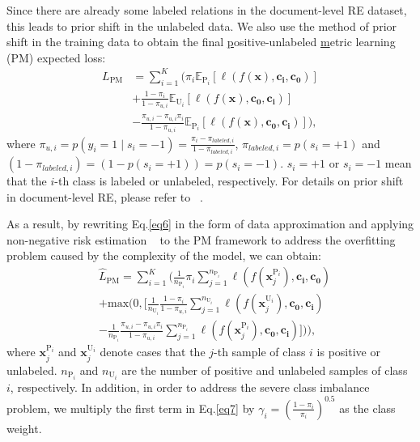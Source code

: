 \documentclass[letterpaper]{article}
\begin{document}
Since there are already some labeled relations in the document-level RE dataset, this leads to prior shift in the unlabeled data. We also use the method of prior shift in the training data to obtain the final \underline{p}ositive-unlabeled \underline{m}etric learning (PM) expected loss:
\begin{equation}
\begin{aligned}\label{eq6}
L_{\mathrm{PM}}&=\sum_{i=1}^{K}(\pi_{i} \mathbb{E}_{\mathrm{P}_{i}}[ \ell(f(\boldsymbol{x}), \boldsymbol{c_{i}}, \boldsymbol{c_{0}})] \\
&+\frac{1-\pi_{i}}{1-\pi_{u,i}} \mathbb{E}_{\mathrm{U}_{i}}[\ell(f(\boldsymbol{x}), \boldsymbol{c_{0}}, \boldsymbol{c_{i}})] \\
&-\frac{\pi_{u,i}-\pi_{u,i} \pi_{i}}{1-\pi_{u,i}}\mathbb{E}_{\mathrm{P}_{i}}[\ell(f(\boldsymbol{x}), \boldsymbol{c_{0}}, \boldsymbol{c_{i}})]),
\end{aligned}
\end{equation}
where $\pi_{u,i}=p(y_{i}=1 \mid s_{i}=-1)=\frac{\pi_{i}-\pi_{labeled,i}}{1-\pi_{labeled,i}}$, $\pi_{labeled,i}=p(s_{i}=+1)$ and $(1-\pi_{labeled,i})=(1-p(s_{i}=+1))=p(s_{i}=-1)$. $s_{i}=+1$ or $s_{i}=-1$ mean that the $i$-th class is labeled or unlabeled, respectively. For details on prior shift in document-level RE, please refer to ~\cite{DBLP:conf/emnlp/WangLHZ22}.

As a result, by rewriting Eq.\ref{eq6} in the form of data approximation and applying non-negative risk estimation ~\cite{DBLP:conf/nips/KiryoNPS17} to the PM framework to address the overfitting problem caused by the complexity of the model, we can obtain:
\begin{equation}
\begin{aligned}\label{eq7}
&\widehat{L}_{\mathrm{PM}}=\sum_{i=1}^{K}( \frac{1}{n_{\mathrm{P}_{i}}}\pi_{i} \sum_{j=1}^{n_{\mathrm{P}_{i}}}\ell(f(\boldsymbol{x}_{j}^{\mathrm{P}_{i}}), \boldsymbol{c_{i}}, \boldsymbol{c_{0}}) \\&+\mathrm{max}(0, [\frac{1}{n_{\mathrm{U}_{i}}} \frac{1-\pi_{i}}{1-\pi_{u,i}} \sum_{j=1}^{n_{\mathrm{U}_{i}}} \ell(f(\boldsymbol{x}_{j}^{\mathrm{U}_{i}}), \boldsymbol{c_{0}}, \boldsymbol{c_{i}})\\&-\frac{1}{n_{\mathrm{P}_{i}}}\frac{\pi_{u,i}-\pi_{u,i} \pi_{i}}{1-\pi_{u,i}} \sum_{j=1}^{n_{\mathrm{P}_{i}}}\ell(f(\boldsymbol{x}_{j}^{\mathrm{P}_{i}}), \boldsymbol{c_{0}}, \boldsymbol{c_{i}})])),
\end{aligned}
\end{equation}
where $\boldsymbol{x}_{j}^{\mathrm{P}_{i}}$ and $\boldsymbol{x}_{j}^{\mathrm{U}_{i}}$ denote cases that the $j$-th sample of class $i$ is positive or unlabeled. $n_{\mathrm{P}_{i}}$ and $n_{\mathrm{U}_{i}}$ are the number of positive and unlabeled samples of class $i$, respectively. In addition, in order to address the severe class imbalance problem, we multiply the first term in Eq.\ref{eq7} by $\gamma_{i}=(\frac{1-\pi_{i}}{\pi_{i}})^{0.5}$ as the class weight.
\end{document}
